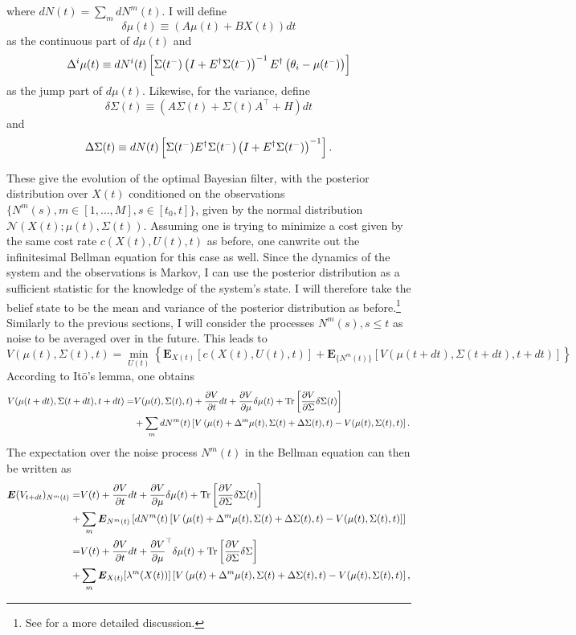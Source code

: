where $dN(t) = \sum_m dN^m(t)$. I will define 
$$
\delta \mu(t) \equiv (A\mu(t) + B X(t)) dt
$$
as the continuous part of $d\mu(t)$ and 
$$
\Delta^i \mu(t) \equiv dN^i(t) \left[\Sigma(t^-)\left(I+E^\dagger \Sigma(t^-)\right)^{-1} E^\dagger\left(\theta_i - \mu(t^-)\right)\right]
$$
as the jump part of $d\mu(t)$. Likewise, for the variance, define
$$
\delta\Sigma(t) \equiv (A\Sigma(t) + \Sigma(t) A^\top + H)dt
$$ 
and
$$
\Delta\Sigma(t) \equiv dN(t) \left[\Sigma(t^-) E^\dagger \Sigma(t^-) \left(I+E^\dagger \Sigma(t^-)\right)^{-1}\right].
$$\par
These give the evolution of the optimal Bayesian filter, with the posterior distribution over $X(t)$ conditioned on the observations $\{N^m(s), m\in [1,\ldots,M], s\in[t_0,t]\}$,
given by the normal distribution $\mathcal{N}(X(t);\mu(t),\Sigma(t))$. Assuming one is trying to minimize a cost given by the same cost rate $c(X(t),U(t),t)$ as before, one canwrite out 
the infinitesimal Bellman equation for this case as well. Since the dynamics of the system and the observations is Markov, I can use the posterior distribution as a sufficient statistic for 
the knowledge of the system's state. I will therefore take the belief state to be the mean and variance of the posterior distribution as before.\footnote{See  for a 
more  detailed discussion.}
Similarly to the previous sections, I will consider the processes $N^m(s), s\le t$ as noise to be averaged over in the future. This leads to
$$
V(\mu(t),\Sigma(t),t)= \min_{U(t)} \left\{\boldsymbol{E}_{X(t)}\left[c(X(t),U(t),t)\right] + \boldsymbol{E}_{\{N^m(t)\}}\left[V(\mu({t+dt}),\Sigma(t+dt),t+dt)\right]\right\}
$$
According to It\=o's lemma, one obtains
\begin{eqnarray*}
V(\mu({t+dt}),\Sigma(t+dt),t+dt) =& V(\mu(t),\Sigma(t),t) + \frac{\partial V}{\partial t}dt + \frac{\partial V}{\partial \mu} \delta\mu(t) +\operatorname{Tr}\left[\frac{\partial V}{\partial \Sigma} \delta \Sigma(t)\right]\\ &+ \sum_m dN^m(t)\left[V\left(\mu(t) +\Delta^m\mu(t) , \Sigma(t)+\Delta\Sigma(t),t\right)-V(\mu(t),\Sigma(t),t)\right].
\end{eqnarray*}
The expectation over the noise process $N^m(t)$ in the Bellman equation can then be written as
\begin{eqnarray*}
\boldsymbol{E}(V_{t+dt})_{N^m(t)} =&V(t) + \frac{\partial V}{\partial t}dt + \frac{\partial V}{\partial \mu} \delta\mu(t) +\operatorname{Tr}\left[\frac{\partial V}{\partial \Sigma} \delta \Sigma(t)\right]\\ +& \sum_m \boldsymbol{E}_{N^m(t)}\left[dN^m(t)\left[V\left(\mu(t) +\Delta^m\mu(t) , \Sigma(t)+\Delta\Sigma(t),t\right)-V(\mu(t),\Sigma(t),t)\right]\right] \\
 =&V(t) + \frac{\partial V}{\partial t}dt + \frac{\partial V}{\partial \mu}^\top \delta\mu(t) +\operatorname{Tr}\left[\frac{\partial V}{\partial \Sigma} \delta \Sigma\right]\\ +& \sum_m \boldsymbol{E}_{X(t)}[\lambda^m(X(t))] \left[V\left(\mu(t) +\Delta^m\mu(t) , \Sigma(t)+\Delta\Sigma(t),t\right)-V(\mu(t),\Sigma(t),t)\right],
\end{eqnarray*}
